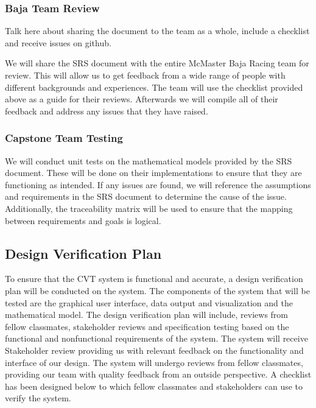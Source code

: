\documentclass[12pt, titlepage]{article}
\begin{document}
\subsubsection*{Baja Team Review}
Talk here about sharing the document to the team as a whole, include a checklist and receive issues on github.

We will share the SRS document with the entire McMaster Baja Racing team for review.
This will allow us to get feedback from a wide range of people with different backgrounds and experiences.
The team will use the checklist provided above as a guide for their reviews.
Afterwards we will compile all of their feedback and address any issues that they have raised.

\subsubsection*{Capstone Team Testing}

We will conduct unit tests on the mathematical models provided by the SRS document.
These will be done on their implementations to ensure that they are functioning as intended.
If any issues are found, we will reference the assumptions and requirements in the SRS document to determine the cause of the issue.
Additionally, the traceability matrix will be used to ensure that the mapping between requirements and goals is logical. 

\subsection{Design Verification Plan}

\noindent To ensure that the CVT system is functional and accurate, a design verification plan will be conducted on the system. 
The components of the system that will be tested are the graphical user interface, data output and visualization and the mathematical model. 
The design verification plan will include, reviews from fellow classmates, stakeholder reviews and specification testing based on the functional and nonfunctional requirements of the system. 
The system will receive Stakeholder review providing us with relevant feedback on the functionality and interface of our design.
The system will undergo reviews from fellow classmates, providing our team with quality feedback from an outside perspective. 
A checklist has been designed below to which fellow classmates and stakeholders can use to verify the system.  
\end{document}
